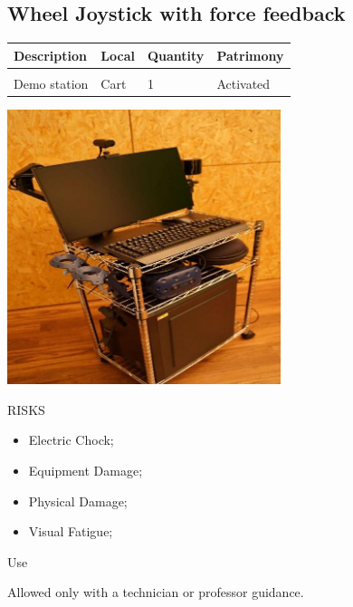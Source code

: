 \subsection{Wheel Joystick with force feedback}
\begin{tabularx}{\textwidth}{ Y  Y  Y  Y }
    \textbf{Description} &  \textbf{Local} &  \textbf{Quantity} & \textbf{Patrimony}\\
    \hline \\
     Demo station & Cart & 1 & Activated
\end{tabularx}
\vspace{1cm}

\begin{multicols}{2}

\includegraphics[width=80mm, keepaspectratio]{imgs/image3.jpg}

\columnbreak

\begin{mdframed}[roundcorner=10pt, linecolor=red, linewidth=2pt]
\vspace{1em}
{\Large {\color{red}RISKS}}
\vspace{1em}

\begin{itemize}
    \item Electric Chock;
    \item Equipment Damage;
    \item Physical Damage;
    \item Visual Fatigue; 
\end{itemize}

\vspace{1em}
\end{mdframed}

\vspace{2em}

{\Large Use}
\vspace{1em}

Allowed only with a technician or professor guidance.
\end{multicols}

